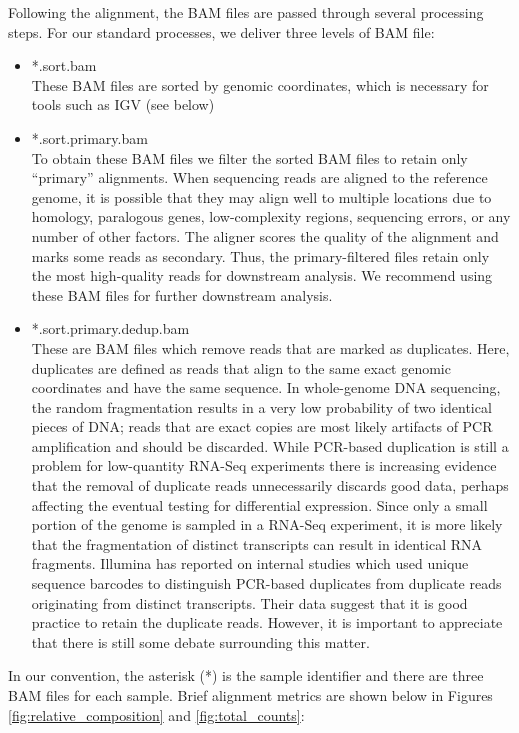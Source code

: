 \documentclass{article}
\begin{document}
Following the alignment, the BAM files are passed through several processing steps.  For our standard processes, we deliver three levels of BAM file:
\begin{itemize}
\item *.sort.bam \\
These BAM files are sorted by genomic coordinates, which is necessary for tools such as IGV (see below)
\item *.sort.primary.bam \\
To obtain these BAM files we filter the sorted BAM files to retain only ``primary'' alignments.  When sequencing reads are aligned to the reference genome, it is possible that they may align well to multiple locations due to homology, paralogous genes, low-complexity regions, sequencing errors, or any number of other factors.  The aligner scores the quality of the alignment and marks some reads as secondary.  Thus, the primary-filtered files retain only the most high-quality reads for downstream analysis.  We recommend using these BAM files for further downstream analysis.  
\item *.sort.primary.dedup.bam \\
These are BAM files which remove reads that are marked as duplicates.  Here, duplicates are defined as reads that align to the same exact genomic coordinates and have the same sequence.  In whole-genome DNA sequencing, the random fragmentation results in a very low probability of two identical pieces of DNA; reads that are exact copies are most likely artifacts of PCR amplification and should be discarded.  While PCR-based duplication is still a problem for low-quantity RNA-Seq experiments there is increasing evidence that the removal of duplicate reads unnecessarily discards good data, perhaps affecting the eventual testing for differential expression.  Since only a small portion of the genome is sampled in a RNA-Seq experiment, it is more likely that the fragmentation of distinct transcripts can result in identical RNA fragments.  Illumina has reported on internal studies which used unique sequence barcodes to distinguish PCR-based duplicates from duplicate reads originating from distinct transcripts.  Their data suggest that it is good practice to retain the duplicate reads.  However, it is important to appreciate that there is still some debate surrounding this matter.  
\end{itemize}

In our convention, the asterisk (*) is the sample identifier and there are three BAM files for each sample.
Brief alignment metrics are shown below in Figures \ref{fig:relative_composition} and \ref{fig:total_counts}:
\end{document}
